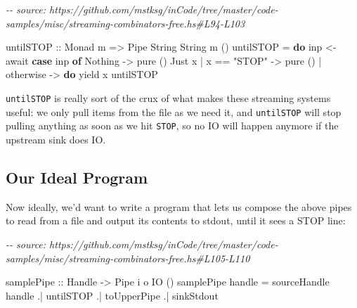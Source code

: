 \documentclass[]{article}
\newenvironment{Shaded}{}{}
\newcommand{\CommentTok}[1]{\textcolor[rgb]{0.38,0.63,0.69}{\textit{#1}}}
\newcommand{\DataTypeTok}[1]{\textcolor[rgb]{0.56,0.13,0.00}{#1}}
\newcommand{\FunctionTok}[1]{\textcolor[rgb]{0.02,0.16,0.49}{#1}}
\newcommand{\KeywordTok}[1]{\textcolor[rgb]{0.00,0.44,0.13}{\textbf{#1}}}
\newcommand{\NormalTok}[1]{#1}
\newcommand{\OperatorTok}[1]{\textcolor[rgb]{0.40,0.40,0.40}{#1}}
\newcommand{\OtherTok}[1]{\textcolor[rgb]{0.00,0.44,0.13}{#1}}
\newcommand{\StringTok}[1]{\textcolor[rgb]{0.25,0.44,0.63}{#1}}
\begin{document}
\begin{Shaded}
\begin{Highlighting}[]
\CommentTok{{-}{-} source: https://github.com/mstksg/inCode/tree/master/code{-}samples/misc/streaming{-}combinators{-}free.hs\#L94{-}L103}

\OtherTok{untilSTOP ::} \DataTypeTok{Monad}\NormalTok{ m }\OtherTok{=>} \DataTypeTok{Pipe} \DataTypeTok{String} \DataTypeTok{String}\NormalTok{ m ()}
\NormalTok{untilSTOP }\OtherTok{=} \KeywordTok{do}
\NormalTok{    inp }\OtherTok{<{-}}\NormalTok{ await}
    \KeywordTok{case}\NormalTok{ inp }\KeywordTok{of}
      \DataTypeTok{Nothing} \OtherTok{{-}>} \FunctionTok{pure}\NormalTok{ ()}
      \DataTypeTok{Just}\NormalTok{ x}
        \OperatorTok{|}\NormalTok{ x }\OperatorTok{==} \StringTok{"STOP"} \OtherTok{{-}>} \FunctionTok{pure}\NormalTok{ ()}
        \OperatorTok{|} \FunctionTok{otherwise}   \OtherTok{{-}>} \KeywordTok{do}
\NormalTok{            yield x}
\NormalTok{            untilSTOP}
\end{Highlighting}
\end{Shaded}

\texttt{untilSTOP} is really sort of the crux of what makes these streaming
systems useful: we only pull items from the file as we need it, and
\texttt{untilSTOP} will stop pulling anything as soon as we hit \texttt{STOP},
so no IO will happen anymore if the upstream sink does IO.

\hypertarget{our-ideal-program}{%
\subsection{Our Ideal Program}\label{our-ideal-program}}

Now ideally, we'd want to write a program that lets us compose the above pipes
to read from a file and output its contents to stdout, until it sees a STOP
line:

\begin{Shaded}
\begin{Highlighting}[]
\CommentTok{{-}{-} source: https://github.com/mstksg/inCode/tree/master/code{-}samples/misc/streaming{-}combinators{-}free.hs\#L105{-}L110}

\OtherTok{samplePipe ::} \DataTypeTok{Handle} \OtherTok{{-}>} \DataTypeTok{Pipe}\NormalTok{ i o }\DataTypeTok{IO}\NormalTok{ ()}
\NormalTok{samplePipe handle }\OtherTok{=}
\NormalTok{       sourceHandle handle}
    \OperatorTok{.|}\NormalTok{ untilSTOP}
    \OperatorTok{.|}\NormalTok{ toUpperPipe}
    \OperatorTok{.|}\NormalTok{ sinkStdout}
\end{Highlighting}
\end{Shaded}
\end{document}
